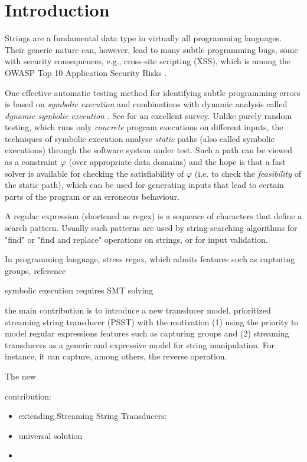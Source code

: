 
\section{Introduction}



Strings are a fundamental data type in virtually all programming languages.
Their generic nature can, however, lead to many subtle programming
bugs, some with security consequences, e.g., cross-site scripting
(XSS), which is among the OWASP Top 10 Application Security Risks
\cite{owasp17}. 

One effective
automatic testing method for identifying subtle programming errors
is based on \emph{symbolic execution}
\cite{king76} and combinations with dynamic analysis
called \emph{dynamic symbolic execution} \cite{jalangi,DART,EXE,CUTE,KLEE}.
See \cite{symbex-survey} for an excellent survey. Unlike purely random testing,
which runs only \emph{concrete} program executions on different
inputs, the techniques of symbolic execution analyse \emph{static} paths
(also called symbolic executions) through the software system under test.
Such a path can be viewed as a constraint $\varphi$ (over
appropriate data domains) and the hope is that a fast
solver is available for checking the satisfiability of $\varphi$ (i.e. to check
the \emph{feasibility} of the static path), which can be used for generating
inputs that lead to certain parts of the program or an erroneous behaviour.


A regular expression (shortened as regex) is a sequence of characters that define a search pattern. Usually such patterns are used by string-searching algorithms for "find" or "find and replace" operations on strings, or for input validation.  


In programming language, stress regex, which admits features such as capturing groups, reference


symbolic execution requires SMT solving 

the main contribution is to introduce  a new transducer model, prioritized streaming string transducer (PSST) with the  motivation 
(1) using the priority to model regular expressions features such as capturing groups and (2) streaming transducers as a generic and expressive model for string manipulation. For instance, it can capture, among others, the reverse operation. 

The new 

contribution: 

\begin{itemize}
	\item extending Streaming String Transducers: \cite{FR17}
	
	\item  universal solution 
	
	\item 
\end{itemize} 